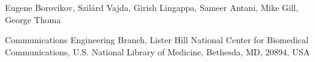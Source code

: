 \documentclass[landscape,a0,final]{a0poster}
\newcommand{\Heading}{\fontsize{60}{75}\selectfont}
\newcommand{\Authors}{\LARGE}
\newcommand{\Institutes}{\Large}
\begin{document}
\begin{header}
\vspace*{-2cm}
\begin{center}
	\begin{minipage}[t]{0.95\textwidth}
		\begin{center}
			\vspace{2cm}
			{\Authors Eugene Borovikov, Szil\'{a}rd Vajda, Girish Lingappa, Sameer Antani, Mike Gill, George Thoma}
			\vspace{1cm}
			{	\Institutes \centerline{ Communications Engineering Branch,  Lister Hill National Center for Biomedical Communications, U.S. National Library of Medicine, Bethesda, MD, 20894, USA}}
		\end{center}
	\end{minipage}
\end{center}

\end{header}

\vspace*{1cm}

\begin{poster}

\begin{multicols}{3}





\vspace{2cm}  


\vspace{1cm}  






\end{multicols}
\end{poster}
\end{document}
